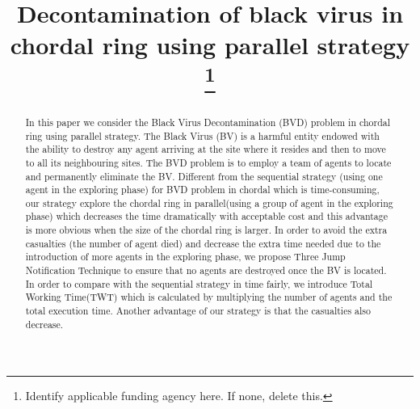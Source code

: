 \documentclass[conference]{IEEEtran}
\begin{document}
\title{Decontamination of black virus in chordal ring using parallel strategy
\\
{\footnotesize \textsuperscript{}}
\thanks{Identify applicable funding agency here. If none, delete this.}
}

\author{
\and
{}
\and
{}
}

\maketitle

\begin{abstract}
In this paper we consider the Black Virus Decontamination (BVD) problem in chordal ring using parallel strategy. The Black Virus (BV) is a harmful entity endowed with the ability to destroy any agent arriving at the site where it resides and then to move to all its neighbouring sites. The BVD problem is to employ a team of agents to locate and permanently eliminate the BV. Different from the sequential strategy (using one agent in the exploring phase) for BVD problem in chordal which is time-consuming, our strategy explore the chordal ring in parallel(using a group of agent in the exploring phase) which decreases the time dramatically with acceptable cost and this advantage is more obvious when the size of the chordal ring is larger. In order to avoid the extra casualties (the number of agent died) and decrease the extra time needed due to the introduction of more agents in the exploring phase, we propose Three Jump Notification Technique to ensure that no agents are destroyed once the BV is located. In order to compare with the sequential strategy in time fairly, we introduce Total Working Time(TWT) which is calculated by multiplying the number of agents and the total execution time. Another advantage of our strategy is that the casualties also decrease.\end{abstract}
\end{document}
